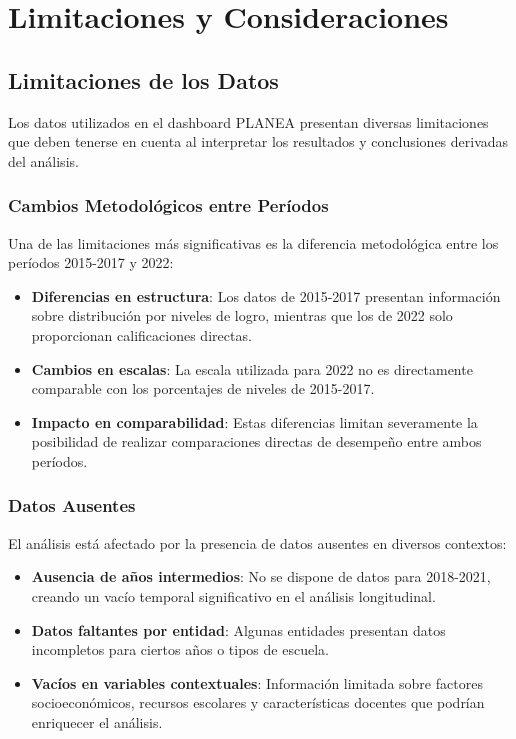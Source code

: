 \chapter{Limitaciones y Consideraciones}

\section{Limitaciones de los Datos}
Los datos utilizados en el dashboard PLANEA presentan diversas limitaciones que deben tenerse en cuenta al interpretar los resultados y conclusiones derivadas del análisis.

\subsection{Cambios Metodológicos entre Períodos}
Una de las limitaciones más significativas es la diferencia metodológica entre los períodos 2015-2017 y 2022:

\begin{itemize}
    \item \textbf{Diferencias en estructura}: Los datos de 2015-2017 presentan información sobre distribución por niveles de logro, mientras que los de 2022 solo proporcionan calificaciones directas.
    
    \item \textbf{Cambios en escalas}: La escala utilizada para 2022 no es directamente comparable con los porcentajes de niveles de 2015-2017.
    
    \item \textbf{Impacto en comparabilidad}: Estas diferencias limitan severamente la posibilidad de realizar comparaciones directas de desempeño entre ambos períodos.
\end{itemize}

\subsection{Datos Ausentes}
El análisis está afectado por la presencia de datos ausentes en diversos contextos:

\begin{itemize}
    \item \textbf{Ausencia de años intermedios}: No se dispone de datos para 2018-2021, creando un vacío temporal significativo en el análisis longitudinal.
    
    \item \textbf{Datos faltantes por entidad}: Algunas entidades presentan datos incompletos para ciertos años o tipos de escuela.
    
    \item \textbf{Vacíos en variables contextuales}: Información limitada sobre factores socioeconómicos, recursos escolares y características docentes que podrían enriquecer el análisis.
\end{itemize}

